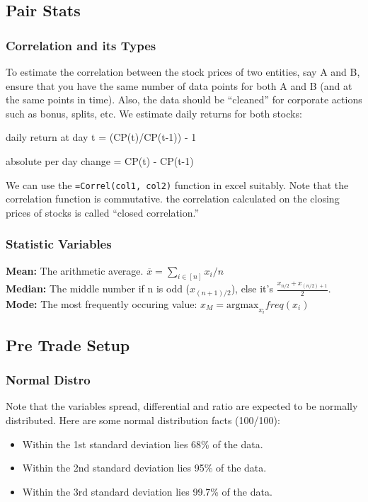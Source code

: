 \documentclass{article}
\begin{document}
\subsection{Pair Stats}
\subsubsection{Correlation and its Types}
To estimate the correlation between the stock prices of two entities, say A and B,
ensure that you have the same number of data points for both A and B (and at the
same points in time). Also, the data should be ``cleaned'' for corporate actions such as bonus, splits, etc. We estimate daily returns for both stocks:
\begin{center}
    daily return at day t = (CP(t)/CP(t-1)) - 1
\end{center}
\begin{center}
    absolute per day change = CP(t) - CP(t-1)
\end{center}
We can use the \texttt{=Correl(col1, col2)} function in excel suitably. Note that
the correlation function is commutative. the correlation calculated on the closing prices of stocks is called ``closed correlation.''
\subsubsection{Statistic Variables}
\textbf{Mean:} The arithmetic average. $\overline{x} = \sum_{i\in [n]}{x_i}/n$\\
\textbf{Median:} The middle number if n is odd ($x_{(n+1)/2}$), else it's $\frac{x_{n/2}+x_{(n/2) + 1}}{2}$.\\
\textbf{Mode:} The most frequently occuring value: $x_M = \text{argmax}_{x_i}{freq(x_i)}$
\subsection{Pre Trade Setup}
\subsubsection{Normal Distro}
Note that the variables spread, differential and ratio are expected to be 
normally distributed. Here are some normal distribution facts (100/100):
\begin{itemize}
    \item Within the 1st standard deviation lies 68\% of the data.
    \item Within the 2nd standard deviation lies 95\% of the data.
    \item Within the 3rd standard deviation lies 99.7\% of the data.
\end{itemize}
\end{document}
